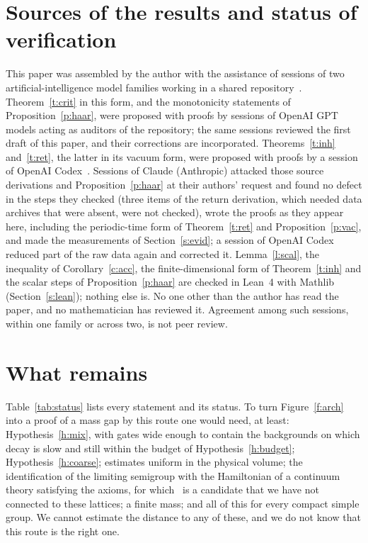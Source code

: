 \section{Sources of the results and status of verification}\label{s:disc}
This paper was assembled by the author with the assistance of sessions of two artificial-intelligence model
families working in a shared repository~\cite{Repo}. Theorem~\ref{t:crit} in this form, and the monotonicity
statements of Proposition~\ref{p:haar}, were proposed with proofs by sessions of OpenAI GPT models acting as
auditors of the repository; the same sessions reviewed the first draft of this paper, and their corrections
are incorporated. Theorems~\ref{t:inh} and~\ref{t:ret}, the latter in its vacuum form, were proposed with
proofs by a session of OpenAI Codex~\cite{RepoRet,RepoInh}. Sessions of Claude (Anthropic) attacked those
source derivations and Proposition~\ref{p:haar} at their authors' request and found no defect in the steps
they checked (three items of the return derivation, which needed data archives that were absent, were not
checked), wrote the
proofs as they appear here, including the periodic-time form of Theorem~\ref{t:ret} and
Proposition~\ref{p:vac}, and made the measurements of Section~\ref{s:evid}; a session of OpenAI Codex reduced
part of the raw data again and corrected it. Lemma~\ref{l:scal}, the inequality of Corollary~\ref{c:acc}, the
finite-dimensional form of Theorem~\ref{t:inh} and the scalar steps of Proposition~\ref{p:haar} are checked
in Lean~4 with Mathlib (Section~\ref{s:lean}); nothing else is. No one other than the author has read the paper, and no mathematician has reviewed it. Agreement
among such sessions, within one family or across two, is not peer review.

\section{What remains}\label{s:rem}
Table~\ref{tab:status} lists every statement and its status. To turn Figure~\ref{f:arch} into a proof of a
mass gap by this route one would need, at least: Hypothesis~\ref{h:mix}, with gates wide enough to contain the
backgrounds on which decay is slow and still within the budget of Hypothesis~\ref{h:budget};
Hypothesis~\ref{h:coarse}; estimates uniform in the physical volume; the identification of the limiting
semigroup with the Hamiltonian of a continuum theory satisfying the axioms, for which~\cite{OAI} is a
candidate that we have not connected to these lattices; a finite mass; and all of this for every compact
simple group. We cannot estimate the distance to any of these, and we do not know that this route is the
right one.

